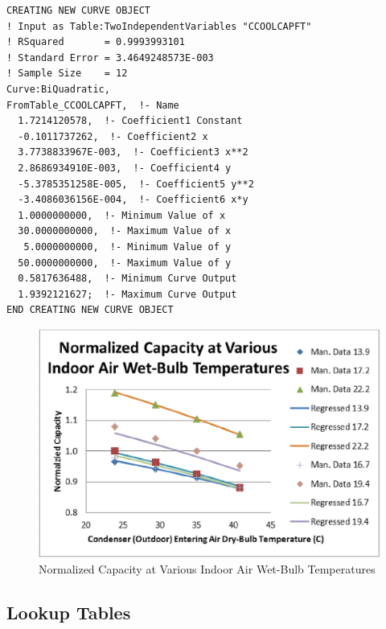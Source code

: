 \begin{lstlisting}
CREATING NEW CURVE OBJECT
! Input as Table:TwoIndependentVariables "CCOOLCAPFT"
! RSquared       = 0.9993993101
! Standard Error = 3.4649248573E-003
! Sample Size    = 12
Curve:BiQuadratic,
FromTable_CCOOLCAPFT,  !- Name
  1.7214120578,  !- Coefficient1 Constant
  -0.1011737262,  !- Coefficient2 x
  3.7738833967E-003,  !- Coefficient3 x**2
  2.8686934910E-003,  !- Coefficient4 y
  -5.3785351258E-005,  !- Coefficient5 y**2
  -3.4086036156E-004,  !- Coefficient6 x*y
  1.0000000000,  !- Minimum Value of x
  30.0000000000,  !- Maximum Value of x
   5.0000000000,  !- Minimum Value of y
  50.0000000000,  !- Maximum Value of y
  0.5817636488,  !- Minimum Curve Output
  1.9392121627;  !- Maximum Curve Output
END CREATING NEW CURVE OBJECT
\end{lstlisting}

\begin{figure}[htbp]
\centering
\includegraphics{media/image7873.png}
\caption{Normalized Capacity at Various Indoor Air Wet-Bulb Temperatures}
\end{figure}

\subsection{Lookup Tables}\label{lookup-tables}

